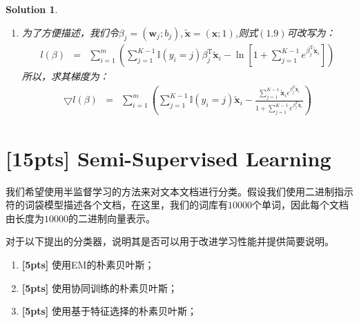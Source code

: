 \documentclass[a4paper,UTF8]{article}
\numberwithin{equation}{section}
\newtheorem*{solution}{Solution}
\begin{document}
\begin{solution}
\begin{enumerate}
		将$(1.8)$代回$(1.7)$得
		\begin{eqnarray}
			l(\mathbf{w}, b) &=& \sum_{i=1}^m(\sum_{j=1}^{K-1}\mathbb{I}(y_i=j)(\mathbf{w}_j^\mathrm{T}\mathbf{x}_i+b_j)-\ln[1+\sum_{j=1}^{K-1}e^{\mathbf{w}_j^\mathrm{T}\mathbf{x}_i+b_j}])
		\end{eqnarray}
		式子$(1.9)$即为所得。
	\item 为了方便描述，我们令$\beta_j=(\mathbf{w}_j;b_j),\widetilde{\mathbf{x}}=(\mathbf{x};1)$,则式$(1.9)$可改写为：
	\begin{eqnarray}
		l(\beta) &=& \sum_{i=1}^m(\sum_{j=1}^{K-1}\mathbb{I}(y_i=j)\beta_j^\mathrm{T}\widetilde{\mathbf{x}}_i-\ln[1+\sum_{j=1}^{K-1}e^{\beta_j^\mathrm{T}\widetilde{\mathbf{x}}_i}])
	\end{eqnarray}
	所以，求其梯度为：
	\begin{eqnarray}
		\bigtriangledown l(\beta) &=& \sum_{i=1}^m(\sum_{j=1}^{K-1}\mathbb{I}(y_i=j)\widetilde{\mathbf{x}}_i-\frac{\sum_{j=1}^{K-1}\widetilde{\mathbf{x}}_i e^{\beta_j^\mathrm{T}\widetilde{\mathbf{x}}_i}}{1+\sum_{j=1}^{K-1}e^{\beta_j^\mathrm{T}\widetilde{\mathbf{x}}_i}})
	\end{eqnarray}

\end{enumerate}
\end{solution}
\newpage

\section{[15pts] Semi-Supervised Learning}
我们希望使用半监督学习的方法来对文本文档进行分类。假设我们使用二进制指示符的词袋模型描述各个文档，在这里，我们的词库有$10000$个单词，因此每个文档由长度为$10000$的二进制向量表示。

对于以下提出的分类器，说明其是否可以用于改进学习性能并提供简要说明。
\begin{enumerate}
	\item \textbf{[5pts]} 使用EM的朴素贝叶斯；
	\item \textbf{[5pts]} 使用协同训练的朴素贝叶斯；
	\item \textbf{[5pts]} 使用基于特征选择的朴素贝叶斯；
\end{enumerate}
\end{document}
